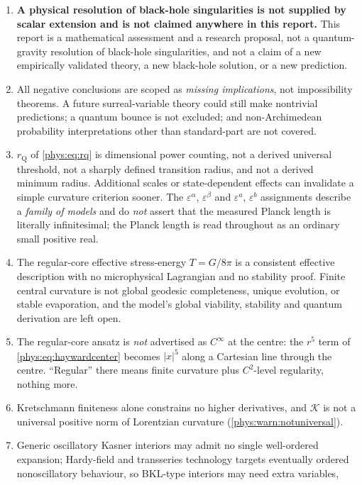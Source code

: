 \documentclass[11pt,letterpaper]{article}
\numberwithin{equation}{section}
\theoremstyle{definition}
\theoremstyle{remark}
\newcommand{\eps}{\varepsilon}
\newcommand{\Kret}{\mathcal K}
\newcommand{\abs}[1]{\lvert#1\rvert}
\begin{document}
\begin{enumerate}[label=\textup{N\arabic*.},leftmargin=3.0em,start=22]
\item \textbf{A physical resolution of black-hole singularities is not supplied
by scalar extension and is not claimed anywhere in this report.} This report is
a mathematical assessment and a research proposal, not a quantum-gravity
resolution of black-hole singularities, and not a claim of a new empirically
validated theory, a new black-hole solution, or a new prediction.
\item All negative conclusions are scoped as \emph{missing implications}, not
impossibility theorems. A future surreal-variable theory could still make
nontrivial predictions; a quantum bounce is not excluded; and
non-Archimedean probability interpretations other than standard-part are not
covered.
\item $r_{\mathrm Q}$ of \eqref{phys:eq:rq} is dimensional power counting, not
a derived universal threshold, not a sharply defined transition radius, and not
a derived minimum radius. Additional scales or state-dependent effects can
invalidate a simple curvature criterion sooner. The $\eps^{\alpha}$,
$\eps^{\beta}$ and $\eps^{a}$, $\eps^{b}$ assignments describe a \emph{family
of models} and do \emph{not} assert that the measured Planck length is
literally infinitesimal; the Planck length is read throughout as an ordinary
small positive real.
\item The regular-core effective stress-energy $T=G/8\pi$ is a consistent
effective description with no microphysical Lagrangian and no stability proof.
Finite central curvature is not global geodesic completeness, unique evolution,
or stable evaporation, and the model's global viability, stability and quantum
derivation are left open.
\item The regular-core ansatz is \emph{not} advertised as $C^{\infty}$ at the
centre: the $r^{5}$ term of \eqref{phys:eq:haywardcenter} becomes $\abs x^{5}$
along a Cartesian line through the centre. ``Regular'' there means finite
curvature plus $C^{2}$-level regularity, nothing more.
\item Kretschmann finiteness alone constrains no higher derivatives, and
$\Kret$ is not a universal positive norm of Lorentzian curvature
(\cref{phys:warn:notuniversal}).
\item Generic oscillatory Kasner interiors may admit no single well-ordered
expansion; Hardy-field and transseries technology targets eventually ordered
nonoscillatory behaviour, so BKL-type interiors may need extra variables,

\end{enumerate}
\end{document}
